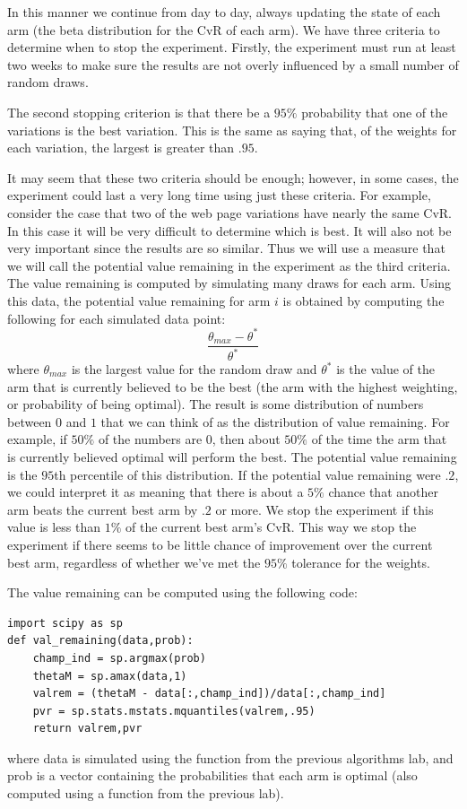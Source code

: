 In this manner we continue from day to day, always updating the state of each arm
(the beta distribution for the CvR of each arm).  We have three criteria to determine 
when to stop the experiment.
Firstly, the experiment must run at least two weeks to make sure the
results are not overly influenced by a small number of random draws.

The second stopping criterion is that there be a $95\%$ probability that one 
of the variations is the best variation.
This is the same as saying that, of the weights for each variation, the largest 
is greater than $.95$.

It may seem that these two criteria should be enough; however, in some cases, the
experiment could last a very long time using just these criteria.
For example, consider the case that two of the web page variations have nearly the same CvR.
In this case it will be very difficult to determine which is best.
It will also not be very important since the results are so similar.
Thus we will use a measure that we will call the potential value remaining
in the experiment as the third criteria.  The value remaining is computed by
simulating many draws for each arm.  Using this data, the potential value remaining
for arm $i$ is obtained by computing the following for each simulated data point:
\begin{equation}\label{valrem}
\frac{\theta_{max} - \theta^*}{\theta^*}
\end{equation}
where $\theta_{max}$ is the largest value for the random draw and $\theta^*$ is the
value of the arm that is currently believed to be the best
(the arm with the highest weighting, or probability of being optimal).
The result is some distribution of numbers between $0$ and $1$ that we can think
of as the distribution of value remaining.  For example, if $50\%$ of the numbers are 0,
then about $50\%$ of the time the arm that is currently believed optimal will perform the best.
The potential value remaining is the $95$th percentile of this distribution.
If the potential value remaining were $.2$, we could interpret it as meaning
that there is about a $5\%$ chance that another arm beats the current best arm by $.2$ or more.
We stop the experiment if this value is less than $1\%$ of the current best arm's CvR.
This way we stop the experiment if there seems to be little chance of improvement over
the current best arm, regardless of whether we've met the $95\%$ tolerance for the weights.

The value remaining can be computed using the following code:
\begin{lstlisting}
import scipy as sp
def val_remaining(data,prob):
    champ_ind = sp.argmax(prob)
    thetaM = sp.amax(data,1)
    valrem = (thetaM - data[:,champ_ind])/data[:,champ_ind]
    pvr = sp.stats.mstats.mquantiles(valrem,.95)
    return valrem,pvr
\end{lstlisting}
where data is simulated using the  function from the previous algorithms lab,
and prob is a vector containing the probabilities that each arm is optimal
(also computed using a function from the previous lab).

